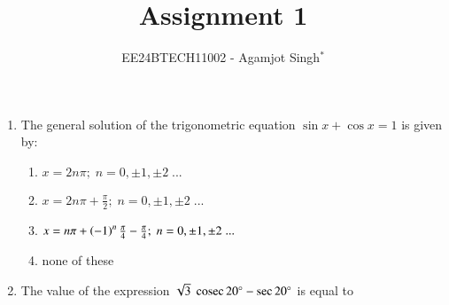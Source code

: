 \documentclass[journal,12pt,twocolumn]{IEEEtran}
\theoremstyle{remark}
\begin{document}

\title{Assignment 1}
\author{EE24BTECH11002 - Agamjot Singh$^{*}$%
}
\maketitle
\newpage
\bigskip

\begin{enumerate}

\section*{\color{black}\colorbox{gray}{ C. }\color{white}\colorbox{magenta}{MCQs with One Correct Answer}}
    \setcounter{enumi}{4}

    \item The general solution of the trigonometric equation $\sin {x} + \cos{x} = 1$ is given by:
        
        \begin{enumerate}[label={(\alph*)}]
            \item $x = 2n\pi;\;n = 0,\pm1,\pm2\;...$
            \item $x = 2n\pi+\frac{\pi}{2};\;n = 0,\pm1,\pm2\;...$
            \item $x = n\pi+\left(-1\right)^n\frac{\pi}{4}-\frac{\pi}{4};\;n = 0,\pm1,\pm2\;...$
            \item none of these
        \end{enumerate}

    \item The value of the expression $\sqrt{3}\;\,\text{cosec}\,{20^\circ}-\sec{20^\circ}$ is equal to
        
        \begin{enumerate}[label={(\alph*)}]
        \end{enumerate}
        

\end{enumerate}
\end{document}
